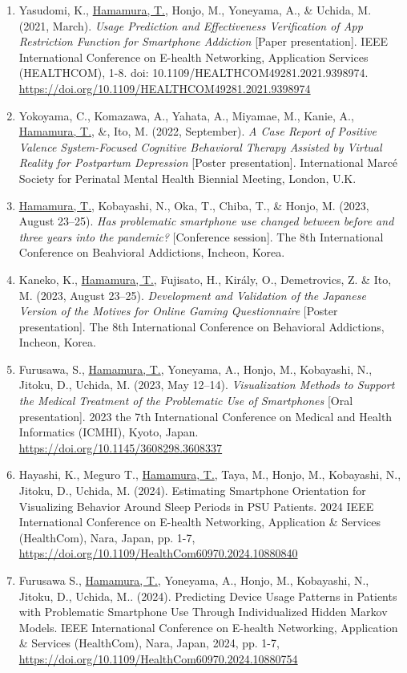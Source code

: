 \documentclass[11pt,a4paper]{article}
\begin{document}
\begin{enumerate}
	\item Yasudomi, K., \underline{Hamamura, T.}, Honjo, M., Yoneyama, A., \& Uchida, M. (2021, March). \textit{Usage Prediction and Effectiveness Verification of App Restriction Function for Smartphone Addiction} [Paper presentation]. IEEE International Conference on E-health Networking, Application Services (HEALTHCOM), 1-8. doi: 10.1109/HEALTHCOM49281.2021.9398974.  \url{https://doi.org/10.1109/HEALTHCOM49281.2021.9398974}
	\item Yokoyama, C., Komazawa, A., Yahata, A., Miyamae, M., Kanie, A., \underline{Hamamura, T.}, \&, Ito, M. (2022, September). \textit{A Case Report of Positive Valence System-Focused Cognitive Behavioral Therapy Assisted by Virtual Reality for Postpartum Depression} [Poster presentation]. International Marc\'e Society for Perinatal Mental Health Biennial Meeting, London, U.K.
	\item \underline{Hamamura, T.}, Kobayashi, N., Oka, T., Chiba, T., \& Honjo, M. (2023, August 23--25). \textit{Has problematic smartphone use changed between before and three years into the pandemic?} [Conference session]. The 8th International Conference on Beahvioral Addictions, Incheon, Korea.
	\item Kaneko, K., \underline{Hamamura, T.}, Fujisato, H., Király, O., Demetrovics, Z. \& Ito, M. (2023, August 23--25). \textit{Development and Validation of the Japanese Version of the Motives for Online Gaming Questionnaire} [Poster presentation]. The 8th International Conference on Behavioral Addictions, Incheon, Korea.
	\item Furusawa, S., \underline{Hamamura, T.}, Yoneyama, A., Honjo, M., Kobayashi, N., Jitoku, D., Uchida, M. (2023, May 12--14). \textit{Visualization Methods to Support the Medical Treatment of the Problematic Use of Smartphones} [Oral presentation]. 2023 the 7th International Conference on Medical and Health Informatics (ICMHI), Kyoto, Japan.  \url{https://doi.org/10.1145/3608298.3608337}
	\item Hayashi, K., Meguro T., \underline{Hamamura, T.}, Taya, M., Honjo, M., Kobayashi, N., Jitoku, D., Uchida, M. (2024). Estimating Smartphone Orientation for Visualizing Behavior Around Sleep Periods in PSU Patients. 2024 IEEE International Conference on E-health Networking, Application \& Services (HealthCom), Nara, Japan, pp. 1-7, \url{https://doi.org/10.1109/HealthCom60970.2024.10880840}
	\item Furusawa S., \underline{Hamamura, T.}, Yoneyama, A., Honjo, M., Kobayashi, N., Jitoku, D., Uchida, M.. (2024). Predicting Device Usage Patterns in Patients with Problematic Smartphone Use Through Individualized Hidden Markov Models. IEEE International Conference on E-health Networking, Application \& Services (HealthCom), Nara, Japan, 2024, pp. 1-7, \url{https://doi.org/10.1109/HealthCom60970.2024.10880754}
\end{enumerate}
\end{document}
